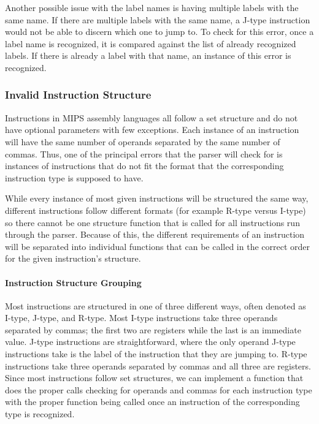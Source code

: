 \documentclass[
    paper=letter,
    parskip=half,
    fontsize=12pt,
    titlepage=firstiscover,
    toc=bibliography,
    numbers=endperiod
]{scrartcl}
\begin{document}
Another possible issue with the label names is having multiple labels
with the same name. If there are multiple labels with the same name, a
J-type instruction would not be able to discern which one to jump to. To
check for this error, once a label name is recognized, it is compared
against the list of already recognized labels. If there is already a
label with that name, an instance of this error is recognized.

\subsubsection{Invalid Instruction Structure}

Instructions in MIPS assembly languages all follow a set structure and
do not have optional parameters with few exceptions. Each instance of an
instruction will have the same number of operands separated by the same
number of commas. Thus, one of the principal errors that the parser will
check for is instances of instructions that do not fit the format that
the corresponding instruction type is supposed to have.

While every instance of most given instructions will be structured the
same way, different instructions follow different formats (for example
R-type versus I-type) so there cannot be one structure function that is
called for all instructions run through the parser. Because of this, the
different requirements of an instruction will be separated into
individual functions that can be called in the correct order for the
given instruction's structure.

\paragraph{Instruction Structure Grouping}

Most instructions are structured in one of three different ways, often
denoted as I-type, J-type, and R-type. Most I-type instructions take
three operands separated by commas; the first two are registers while
the last is an immediate value. J-type instructions are straightforward,
where the only operand J-type instructions take is the label of the
instruction that they are jumping to. R-type instructions take three
operands separated by commas and all three are registers. Since most
instructions follow set structures, we can implement a function that
does the proper calls checking for operands and commas for each
instruction type with the proper function being called once an
instruction of the corresponding type is recognized.
\end{document}

